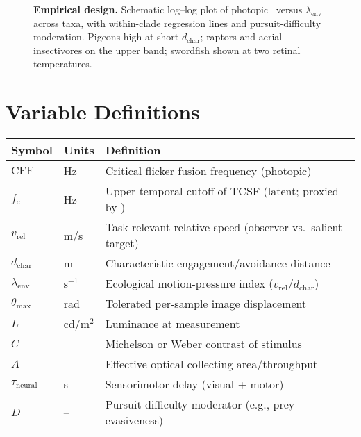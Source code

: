 \documentclass[11pt]{article}
\newcommand{\fc}{f_{\mathrm{c}}}             %
\newcommand{\cff}{\mathrm{CFF}}               %
\newcommand{\vrel}{v_{\mathrm{rel}}}          %
\newcommand{\dchar}{d_{\mathrm{char}}}        %
\newcommand{\lamenv}{\lambda_{\mathrm{env}}}  %
\newcommand{\thetamax}{\theta_{\max}}         %
\newcommand{\taus}{\tau_{\mathrm{neural}}}    %
\newcommand{\Lumin}{L}                        %
\newcommand{\Contrast}{C}                     %
\newcommand{\Aperture}{A}                     %
\begin{document}
\begin{figure}[t]
  \centering
  \fbox{\rule{0pt}{2.5in}\rule{0.9\linewidth}{0pt}}
  \caption{\textbf{Empirical design.} Schematic log--log plot of photopic \cff\ versus $\lamenv$ across taxa, with within-clade regression lines and pursuit-difficulty moderation. Pigeons high at short $\dchar$; raptors and aerial insectivores on the upper band; swordfish shown at two retinal temperatures.}
  \label{fig:design}
\end{figure}




\clearpage
\appendix

\section{Variable Definitions}
\begin{table}[h]
\centering
\begin{tabular}{@{}llp{8.5cm}@{}}
\toprule
Symbol & Units & Definition \\ \midrule
$\cff$ & Hz & Critical flicker fusion frequency (photopic) \\
$\fc$ & Hz & Upper temporal cutoff of TCSF (latent; proxied by \cff) \\
$\vrel$ & m/s & Task-relevant relative speed (observer vs.\ salient target) \\
$\dchar$ & m & Characteristic engagement/avoidance distance \\
$\lamenv$ & s$^{-1}$ & Ecological motion-pressure index ($\vrel/\dchar$) \\
$\thetamax$ & rad & Tolerated per-sample image displacement \\
$\Lumin$ & cd/m$^2$ & Luminance at measurement \\
$\Contrast$ & -- & Michelson or Weber contrast of stimulus \\
$\Aperture$ & -- & Effective optical collecting area/throughput \\
$\taus$ & s & Sensorimotor delay (visual + motor) \\
$D$ & -- & Pursuit difficulty moderator (e.g., prey evasiveness) \\
\bottomrule
\end{tabular}
\end{table}
\end{document}
